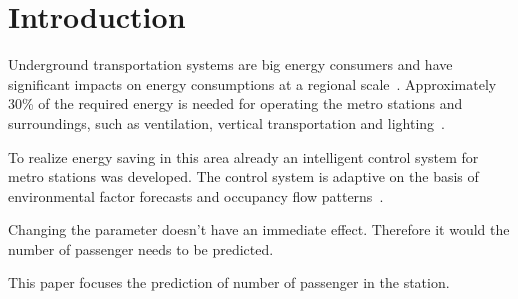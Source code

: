 \section{Introduction}
\label{sec:introduction}

Underground transportation systems are big energy consumers and have significant impacts on energy consumptions at a regional scale~\cite{anderson_maximizing_2009}. Approximately 30\% of the required energy is needed for operating the metro stations and surroundings, such as ventilation, vertical transportation and lighting~\cite{TMB}.

To realize energy saving in this area already an intelligent control system for metro stations was developed. The control system is adaptive on the basis of environmental factor forecasts and occupancy flow patterns~\cite{guo_intelligent_2013}.

Changing the parameter doesn't have an immediate effect. Therefore it would the number of passenger needs to be predicted.

This paper focuses the prediction of number of passenger in the station.
